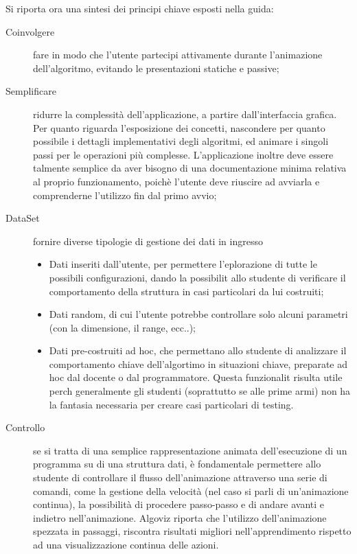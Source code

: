 Si riporta ora una sintesi dei principi chiave esposti nella guida: 
\begin{description}
\item [{{Coinvolgere}}] fare in modo che l'utente partecipi attivamente
durante l'animazione dell'algoritmo, evitando le presentazioni statiche
e passive;
\item [{{Semplificare}}] ridurre la complessità dell'applicazione, a
partire dall'interfaccia grafica. Per quanto riguarda l'esposizione
dei concetti, nascondere per quanto possibile i dettagli implementativi
degli algoritmi, ed animare i singoli passi per le operazioni più
complesse. L'applicazione inoltre deve essere talmente semplice da
aver bisogno di una documentazione minima relativa al proprio funzionamento,
poichè l'utente deve riuscire ad avviarla e comprenderne l'utilizzo
fin dal primo avvio;
\item [{{DataSet}}] fornire diverse tipologie di gestione dei dati in
ingresso

\begin{itemize}
\item Dati inseriti dall'utente, per permettere l'eplorazione di tutte le
possibili configurazioni, dando la possibilit allo studente di verificare
il comportamento della struttura in casi particolari da lui costruiti; 
\item Dati random, di cui l'utente potrebbe controllare solo alcuni parametri
(con la dimensione, il range, ecc..); 
\item Dati pre-costruiti ad hoc, che permettano allo studente di analizzare
il comportamento chiave dell'algortimo in situazioni chiave, preparate
ad hoc dal docente o dal programmatore. Questa funzionalit risulta
utile perch generalmente gli studenti (soprattutto se alle prime armi)
non ha la fantasia necessaria per creare casi particolari di testing. 
\end{itemize}
\item [{{Controllo}}] se si tratta di una semplice rappresentazione animata
dell'esecuzione di un programma su di una struttura dati, è fondamentale
permettere allo studente di controllare il flusso dell'animazione
attraverso una serie di comandi, come la gestione della velocità (nel
caso si parli di un'animazione continua), la possibilità di procedere
passo-passo e di andare avanti e indietro nell'animazione. Algoviz
riporta che l'utilizzo dell'animazione spezzata in passaggi, riscontra
risultati migliori nell'apprendimento rispetto ad una visualizzazione
continua delle azioni. 
\end{description}

